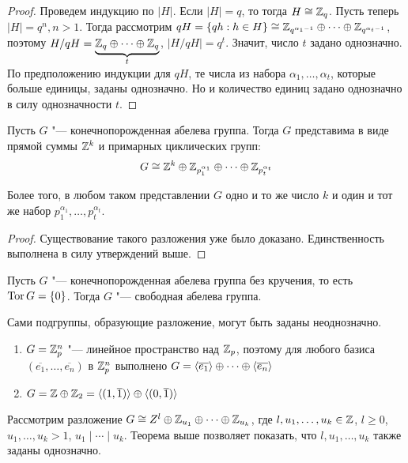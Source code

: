 \begin{proof}
	Проведем индукцию по $|H|$. Если $|H| = q$, то тогда $H \cong \mathbb{Z}_q$. Пусть теперь $|H| = q^n, n > 1$. Тогда рассмотрим $qH \hm= \{qh : h \in H\} \cong \Z_{q^{\alpha_1 - 1}} \oplus \dotsb \oplus \Z_{q^{\alpha_t - 1}}$, поэтому $H / qH = \underbrace{\mathbb{Z}_q \oplus \dotsb \oplus \mathbb{Z}_q}_{t}$, $|H / qH| = q^t$. Значит, число $t$ задано однозначно. По предположению индукции для $qH$, те числа из набора $\alpha_1, \dotsc, \alpha_t$, которые больше единицы, заданы однозначно. Но и количество единиц задано однозначно в силу однозначности $t$.
\end{proof}

\begin{theorem}
	Пусть $G$ "--- конечнопорожденная абелева группа. Тогда $G$ представима в виде прямой суммы $\mathbb{Z}^k$ и примарных циклических групп: 
	\[G \cong \mathbb{Z}^k \oplus \mathbb{Z}_{p_1^{\alpha_1}} \oplus \dots \oplus \mathbb{Z}_{p_t^{\alpha_t}}\]
	
	Более того, в любом таком представлении $G$ одно и то же число $k$ и один и тот же набор $p_1^{\alpha_1}, \dotsc, p_t^{\alpha_t}$.
\end{theorem}

\begin{proof}
	Существование такого разложения уже было доказано. Единственность выполнена в силу утверждений выше.
\end{proof}

\begin{corollary}
	Пусть $G$ "--- конечнопорожденная абелева группа без кручения, то есть $\operatorname{Tor}{G} = \{0\}$. Тогда $G$ "--- свободная абелева группа.
\end{corollary}

\begin{example}
	Сами подгруппы, образующие разложение, могут быть заданы неоднозначно.
	\begin{enumerate}
		\item $G = \mathbb{Z}_p^n$ "--- линейное пространство над $\mathbb{Z}_p$, поэтому для любого базиса $(\overline{e_1}, \dotsc, \overline{e_n})$ в $\mathbb{Z}_p^n$ выполнено $G = \langle\overline{e_1}\rangle \oplus \dotsb \oplus \langle\overline{e_n}\rangle$
		\item $G = \mathbb{Z} \oplus \mathbb{Z}_2 = \langle(1, \overline{1})\rangle \oplus\langle(0, \overline{1})\rangle$
	\end{enumerate}
\end{example}

\begin{note}
	Рассмотрим разложение $G \cong Z^l \oplus \mathbb{Z}_{u_1} \oplus \dots \oplus \mathbb{Z}_{u_k}$, где $l, u_1, \dotsc, u_k \in \mathbb{Z}$, $l \ge 0$, $u_1, \dotsc, u_k > 1$, $u_1 \mid \dotsb \mid u_k$. Теорема выше позволяет показать, что $l, u_1, \dotsc, u_k$ также заданы однозначно.
\end{note}

